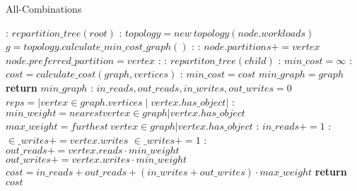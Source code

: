 \documentclass[mscthesis,12pt]{usiinfthesis}
\begin{document}
\begin{algorithm}
	\caption{All-Combinations}\label{alg:all-combinations}
	\begin{algorithmic}[1]
	:
	\State $repartition\_tree(root)$
	\EndFunction
	:
		\State $topology = new\ topology(node.workloads)$
		\State $g = topology.calculate\_min\_cost\_graph()$
		:
		  :
		  \State $node.partitions += vertex$
			  \State $node.preferred\_partition = vertex$
			\EndIf
		  \EndIf
		\EndFor
	  \EndIf
	  :
		:
		  \State $repartiton\_tree(child)$
		  \EndFor
	  \EndIf
	  \EndFunction
	  :
	  \State $min\_cost = \infty$
		:
		  \State $cost = calculate\_cost(graph, vertices)$
		  :
			\State $min\_cost = cost$
			\State $min\_graph = graph$
		  \EndIf
		\EndFor
	  \State \textbf{return} $min\_graph$
	  \EndFunction
	  :
		\State $in\_reads, out\_reads, in\_writes, out\_writes = 0$
		\State $reps = |vertex \in graph.vertices \mid vertex.has\_object|$
		:
		\State $min\_weight = nearest vertex \in graph | vertex.has\_object$
		\State $max\_weight = furthest\ vertex \in graph | vertex.has\_object$
		  :
			\State $in\_reads+= 1$
			:
			\State $\in\_writes+= vertex.writes$
			\Else
			\State  $\in\_writes+= 1 $
			\EndIf
		  \Else:
			\State $out\_reads += vertex.reads \cdot min\_weight$
			\State $out\_writes += vertex.writes \cdot min\_weight$
		  \EndIf
		\EndFor
		\State $cost = in\_reads+ out\_reads + (in\_writes+ out\_writes) \cdot max\_weight$
		\State \textbf{return} $cost$
	\EndFunction
	\end{algorithmic}
	\end{algorithm}
\end{document}
